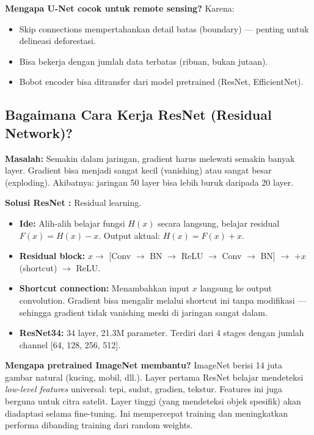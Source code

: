 \documentclass[10pt,a4paper,onecolumn]{article}
\begin{document}
\textbf{Mengapa U-Net cocok untuk remote sensing?} Karena:
\begin{itemize}[nosep]
    \item Skip connections mempertahankan detail batas (boundary)
          — penting untuk delineasi deforestasi.
    \item Bisa bekerja dengan jumlah data terbatas (ribuan,
          bukan jutaan).
    \item Bobot encoder bisa ditransfer dari model pretrained
          (ResNet, EfficientNet).
\end{itemize}

\subsection{Bagaimana Cara Kerja ResNet (Residual Network)?}

\textbf{Masalah:} Semakin dalam jaringan, gradient harus melewati
semakin banyak layer. Gradient bisa menjadi sangat kecil (vanishing)
atau sangat besar (exploding). Akibatnya: jaringan 50 layer bisa
lebih buruk daripada 20 layer.

\textbf{Solusi ResNet \cite{he2016deep}:} Residual learning.

\begin{itemize}[nosep]
    \item \textbf{Ide:} Alih-alih belajar fungsi $H(x)$ secara
          langsung, belajar residual $F(x) = H(x) - x$. Output
          aktual: $H(x) = F(x) + x$.
    \item \textbf{Residual block:} $x \rightarrow $ [Conv $\rightarrow$
          BN $\rightarrow$ ReLU $\rightarrow$ Conv $\rightarrow$ BN]
          $\rightarrow$ $+x$ (shortcut) $\rightarrow$ ReLU.
    \item \textbf{Shortcut connection:} Menambahkan input $x$
          langsung ke output convolution. Gradient bisa mengalir
          melalui shortcut ini tanpa modifikasi — sehingga gradient
          tidak vanishing meski di jaringan sangat dalam.
    \item \textbf{ResNet34:} 34 layer, 21.3M parameter. Terdiri dari
          4 stages dengan jumlah channel [64, 128, 256, 512].
\end{itemize}

\textbf{Mengapa pretrained ImageNet membantu?} ImageNet berisi 14
juta gambar natural (kucing, mobil, dll.). Layer pertama ResNet
belajar mendeteksi \textit{low-level features} universal: tepi,
sudut, gradien, tekstur. Features ini juga berguna untuk citra
satelit. Layer tinggi (yang mendeteksi objek spesifik) akan
diadaptasi selama fine-tuning. Ini mempercepat training dan
meningkatkan performa dibanding training dari random weights.
\end{document}
